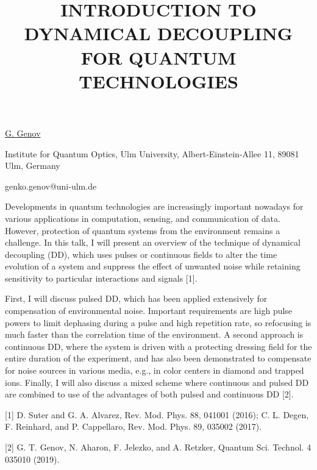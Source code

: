 \title{INTRODUCTION TO DYNAMICAL DECOUPLING FOR QUANTUM TECHNOLOGIES}

\underline{G. Genov}  

{\normalsize{\vspace{-4mm}
Institute for Quantum Optics, Ulm University, Albert-Einstein-Allee 11, 89081 Ulm, Germany



\email genko.genov@uni-ulm.de}}

Developments in quantum technologies are increasingly important nowadays for various applications in computation, sensing, and communication of data. However, protection of quantum systems from the environment remains a challenge. In this talk, I will present an overview of the technique of dynamical decoupling (DD), which uses pulses or continuous fields to alter the time evolution of a system and suppress the effect of unwanted noise while retaining sensitivity to particular interactions and signals [1].

First, I will discuss pulsed DD, which has been applied extensively for compensation of environmental noise. Important requirements are high pulse powers to limit dephasing during a pulse and high repetition rate, so refocusing is much faster than the correlation time of the environment. A second approach is continuous DD, where the system is driven with a protecting dressing field for the entire duration of the experiment, and has also been demonstrated to compensate for noise sources in various media, e.g., in color centers in diamond and trapped ions. Finally, I will also discuss a mixed scheme where continuous and pulsed DD are combined to use of the advantages of both pulsed and continuous DD [2]. 

{\normalsize
[1] D. Suter and G. A. Alvarez, Rev. Mod. Phys. 88, 041001 (2016); C. L. Degen, F. Reinhard, and P. Cappellaro, Rev. Mod. Phys. 89, 035002 (2017).
\vsp

[2] G. T. Genov, N. Aharon, F. Jelezko, and A. Retzker, Quantum Sci. Technol. 4 035010 (2019).
}

\vspace{\baselineskip}
